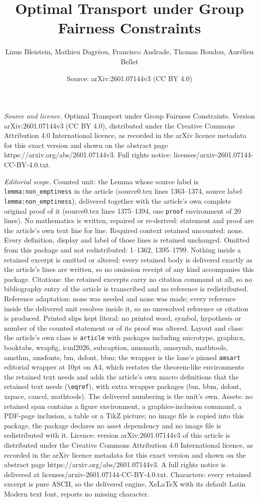 \documentclass[10pt,a4paper]{amsart}
\title[Optimal Transport under Group Fairness Constraints]{Optimal Transport under Group Fairness Constraints}
\author{Linus Bleistein, Mathieu Dagr\'eou, Francisco Andrade, Thomas Boudou, Aur\'elien Bellet}
\date{Source: arXiv:2601.07144v3 (CC BY 4.0)}
\begin{document}
\maketitle

\noindent\emph{Source and licence.} Optimal Transport under Group Fairness Constraints. Version arXiv:2601.07144v3 (CC BY 4.0), distributed under the Creative Commons Attribution 4.0 International licence, as recorded in the arXiv licence metadata for this exact version and shown on the abstract page https://arxiv.org/abs/2601.07144v3. Full rights notice: licenses/arxiv-2601.07144-CC-BY-4.0.txt.\par\smallskip

\noindent\textit{Editorial scope.} Counted unit: the Lemma whose source label is \texttt{lemma:non\_emptiness} in the article (source0.tex lines 1363--1374, source label \texttt{lemma:non\_emptiness}), delivered together with the article's own complete original proof of it (source0.tex lines 1375--1394, one \texttt{proof} environment of 20 lines). No mathematics is written, repaired or re-derived: statement and proof are the article's own text line for line. Required context retained uncounted: none. Every definition, display and label of those lines is retained unchanged. Omitted from this package and not redistributed: 1--1362, 1395--1799. Nothing inside a retained excerpt is omitted or altered: every retained body is delivered exactly as the article's lines are written, so no omission receipt of any kind accompanies this package. Citations: the retained excerpts carry no citation command at all, so no bibliography entry of the article is transcribed and no reference is redistributed. Reference adaptation: none was needed and none was made; every reference inside the delivered unit resolves inside it, so no unresolved reference or citation is produced. Printed slips kept literal: no printed word, symbol, hypothesis or number of the counted statement or of its proof was altered. Layout and class: the article's own class is \texttt{article} with packages including microtype, graphicx, booktabs, wrapfig, icml2026, subcaption, amsmath, amssymb, mathtools, amsthm, amsfonts, bm, dsfont, bbm; the wrapper is the lane's pinned \texttt{amsart} editorial wrapper at 10pt on A4, which restates the theorem-like environments the retained text needs and adds the article's own macro definitions that the retained text needs (\texttt{\textbackslash eqref}), with extra wrapper packages (bm, bbm, dsfont, xspace, cancel, mathtools). The delivered numbering is the unit's own. Assets: no retained span contains a figure environment, a graphics-inclusion command, a PDF-page inclusion, a table or a TikZ picture; no image file is copied into this package, the package declares no asset dependency and no image file is redistributed with it. Licence: version arXiv:2601.07144v3 of this article is distributed under the Creative Commons Attribution 4.0 International licence, as recorded in the arXiv licence metadata for this exact version and shown on the abstract page https://arxiv.org/abs/2601.07144v3. A full rights notice is delivered at licenses/arxiv-2601.07144-CC-BY-4.0.txt. Characters: every retained excerpt is pure ASCII, so the delivered engine, XeLaTeX with its default Latin Modern text font, reports no missing character.
\end{document}
